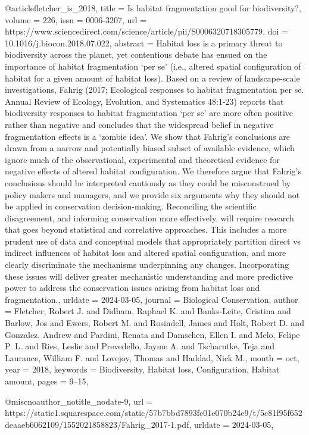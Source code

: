 {{{{@article{fletcher_is_2018,
	title = {Is habitat fragmentation good for biodiversity?},
	volume = {226},
	issn = {0006-3207},
	url = {https://www.sciencedirect.com/science/article/pii/S0006320718305779},
	doi = {10.1016/j.biocon.2018.07.022},
	abstract = {Habitat loss is a primary threat to biodiversity across the planet, yet contentious debate has ensued on the importance of habitat fragmentation ‘per se’ (i.e., altered spatial configuration of habitat for a given amount of habitat loss). Based on a review of landscape-scale investigations, Fahrig (2017; Ecological responses to habitat fragmentation per se. Annual Review of Ecology, Evolution, and Systematics 48:1-23) reports that biodiversity responses to habitat fragmentation ‘per se’ are more often positive rather than negative and concludes that the widespread belief in negative fragmentation effects is a ‘zombie idea’. We show that Fahrig's conclusions are drawn from a narrow and potentially biased subset of available evidence, which ignore much of the observational, experimental and theoretical evidence for negative effects of altered habitat configuration. We therefore argue that Fahrig's conclusions should be interpreted cautiously as they could be misconstrued by policy makers and managers, and we provide six arguments why they should not be applied in conservation decision-making. Reconciling the scientific disagreement, and informing conservation more effectively, will require research that goes beyond statistical and correlative approaches. This includes a more prudent use of data and conceptual models that appropriately partition direct vs indirect influences of habitat loss and altered spatial configuration, and more clearly discriminate the mechanisms underpinning any changes. Incorporating these issues will deliver greater mechanistic understanding and more predictive power to address the conservation issues arising from habitat loss and fragmentation.},
	urldate = {2024-03-05},
	journal = {Biological Conservation},
	author = {Fletcher, Robert J. and Didham, Raphael K. and Banks-Leite, Cristina and Barlow, Jos and Ewers, Robert M. and Rosindell, James and Holt, Robert D. and Gonzalez, Andrew and Pardini, Renata and Damschen, Ellen I. and Melo, Felipe P. L. and Ries, Leslie and Prevedello, Jayme A. and Tscharntke, Teja and Laurance, William F. and Lovejoy, Thomas and Haddad, Nick M.},
	month = oct,
	year = {2018},
	keywords = {Biodiversity, Habitat loss, Configuration, Habitat amount},
	pages = {9--15},
}

@misc{noauthor_notitle_nodate-9,
	url = {https://static1.squarespace.com/static/57b7bbd7893fc01e070b24e9/t/5c81f95f652deaaeb6062109/1552021858823/Fahrig_2017-1.pdf},
	urldate = {2024-03-05},
}

}}}}
